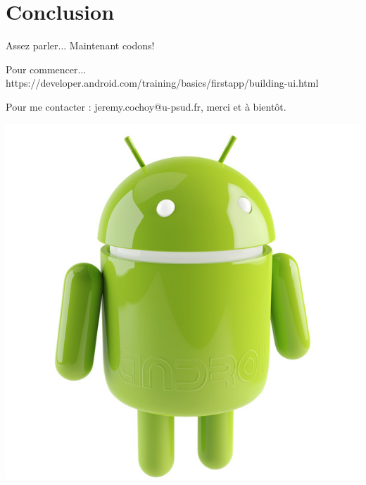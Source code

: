 \documentclass{beamer}
\begin{document}
\section{Conclusion}
\begin{frame}
\begin{alertblock}{Assez parler...}
Maintenant codons!
\end{alertblock}
\begin{block}{Pour commencer...}
https://developer.android.com/training/basics/firstapp/building-ui.html
\end{block}

\end{frame}
\begin{frame}
\begin{center}
Pour me contacter : jeremy.cochoy@u-psud.fr, merci et à bientôt.

\medskip
\medskip
\medskip
\medskip

\includegraphics[scale=0.18]{android.jpg}
\end{center}
\end{frame}
\end{document}
